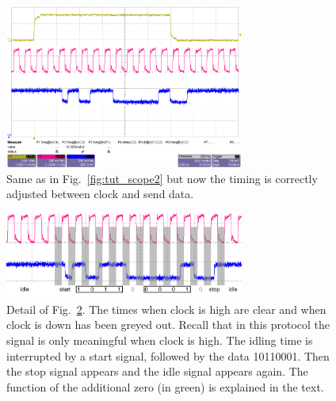 \begin{figure}[h]
    \begin{center}
	\includegraphics[width=0.7\textwidth]{img/tut_scope3.png}
	\caption{Same as in Fig.~\ref{fig:tut_scope2} but now the timing is correctly adjusted between clock and send data.}
	\label{fig:tut_scope3}
    \end{center}
\end{figure}

\begin{figure}[h]
    \begin{center}
	\includegraphics[width=0.7\textwidth]{img/tut_scope3_crop.pdf}
	\caption{Detail of Fig.~\ref{fig:tut_scope3}. The times when clock is high are clear and when clock is down has been greyed out. Recall that in this protocol the signal is only meaningful when clock is high. The idling time is interrupted by a start signal, followed by the data 10110001. Then the stop signal appears and the idle signal appears again. The function of the additional zero (in green) is explained in the text.}
	\label{fig:tut_scope3}
    \end{center}
\end{figure}

